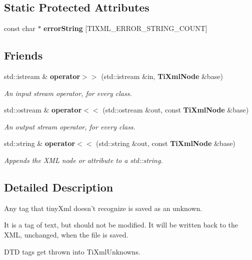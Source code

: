 \subsection*{Static Protected Attributes}
\begin{CompactItemize}
\item 
const char $\ast$ {\bf error\-String} [TIXML\_\-ERROR\_\-STRING\_\-COUNT]
\end{CompactItemize}
\subsection*{Friends}
\begin{CompactItemize}
\item 
std::istream \& {\bf operator$>$$>$} (std::istream \&in, {\bf Ti\-Xml\-Node} \&base)
\begin{CompactList}\small\item\em An input stream operator, for every class. \item\end{CompactList}\item 
std::ostream \& {\bf operator$<$$<$} (std::ostream \&out, const {\bf Ti\-Xml\-Node} \&base)
\begin{CompactList}\small\item\em An output stream operator, for every class. \item\end{CompactList}\item 
std::string \& {\bf operator$<$$<$} (std::string \&out, const {\bf Ti\-Xml\-Node} \&base)\label{classTiXmlNode_TiXmlUnknownn2}

\begin{CompactList}\small\item\em Appends the XML node or attribute to a std::string. \item\end{CompactList}\end{CompactItemize}


\subsection{Detailed Description}
Any tag that tiny\-Xml doesn't recognize is saved as an unknown. 

It is a tag of text, but should not be modified. It will be written back to the XML, unchanged, when the file is saved.

DTD tags get thrown into Ti\-Xml\-Unknowns. 



